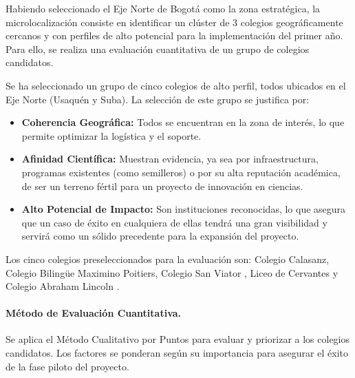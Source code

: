 Habiendo seleccionado el Eje Norte de Bogotá como la zona estratégica, la
microlocalización consiste en identificar un clúster de 3 colegios
geográficamente cercanos y con perfiles de alto potencial para la implementación
del primer año. Para ello, se realiza una evaluación cuantitativa de un grupo de
colegios candidatos.

Se ha seleccionado un grupo de cinco colegios de alto perfil, todos ubicados en
el Eje Norte (Usaquén y Suba). La selección de este grupo se justifica por:
\begin{itemize}
  \item \textbf{Coherencia Geográfica:} Todos se encuentran en la zona de
    interés, lo que permite optimizar la logística y el soporte.
  \item \textbf{Afinidad Científica:} Muestran evidencia, ya sea por
    infraestructura, programas existentes (como semilleros) o por su alta
    reputación académica, de ser un terreno fértil para un proyecto de
    innovación en ciencias.
  \item \textbf{Alto Potencial de Impacto:} Son instituciones reconocidas, lo
    que asegura que un caso de éxito en cualquiera de ellas tendrá una gran
    visibilidad y servirá como un sólido precedente para la expansión del
    proyecto.
\end{itemize}
Los cinco colegios preseleccionados para la evaluación son: Colegio Calasanz,
Colegio Bilingüe Maximino Poitiers, Colegio San Viator \cite{sanviator_web},
Liceo de Cervantes \cite{liceocervantes_web} y Colegio Abraham Lincoln
\cite{abrahamlincoln_web}.

\paragraph{Método de Evaluación Cuantitativa.}
Se aplica el Método Cualitativo por Puntos para evaluar y priorizar a los
colegios candidatos. Los factores se ponderan según su importancia para asegurar
el éxito de la fase piloto del proyecto.

